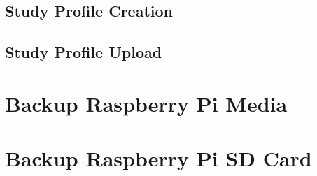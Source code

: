 \documentclass[12pt]{article}
\begin{document}
\begin{center}
	\subsection{Study Profile Creation}
	\subsection{Study Profile Upload}
	\section{Backup Raspberry Pi Media}
	\section{Backup Raspberry Pi SD Card}
\end{center}
\end{document}
